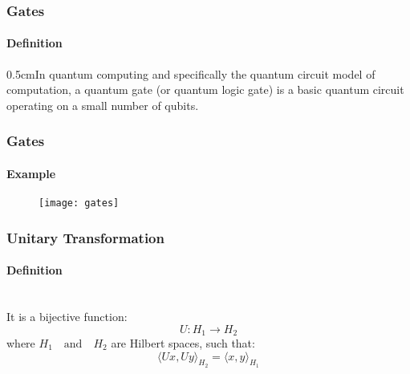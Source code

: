 \begin{frame}
	\frametitle{Gates}
		\framesubtitle{Definition}
		\vspace{-1cm}
	{\normalsize
    \begin{block}{}	
	{0.5cm}{In quantum computing and specifically the quantum circuit model of computation, a quantum gate (or quantum logic gate) is a basic quantum circuit operating on a small number of qubits.}\\
	\end{block}
	}
\end{frame}

\begin{frame}
	\frametitle{Gates}
		\framesubtitle{Example}
	\vspace{0.5cm}
		\begin{figure}
		\centering
			\texttt{[image: gates]}
			\label{fig:gates gates}
		\end{figure}

\end{frame}


\begin{frame}
	\frametitle{Unitary Transformation}
		\framesubtitle{Definition}
		\vspace{-1cm}
	{\normalsize
	\hspace{0.5cm}{Unitary transformation is transformation  that preserves the inner product (isometry).}\\
	\vspace{0.5cm}
	 It is a bijective function:
	$$ U:H_1 \to H_2 $$
where $H_1  \quad \textrm{and} \quad  H_2$ are Hilbert spaces, such that:\\
$$\langle Ux,Uy\rangle_{H_{2}}=\langle x,y\rangle _{H_{1}}$$
	}
\end{frame}

